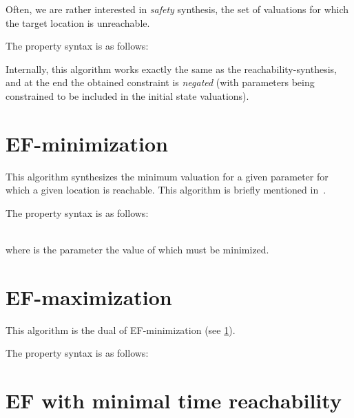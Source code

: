 Often, we are rather interested in \emph{safety} synthesis, \ie{} the set of valuations for which the target location is unreachable.

%

The property syntax is as follows:


Internally, this algorithm works exactly the same as the reachability-synthesis, and at the end the obtained constraint is \emph{negated} (with parameters being constrained to be included in the initial state valuations).


\section{EF-minimization}\label{ss:mode:EFmin}

This algorithm synthesizes the minimum valuation for a given parameter for which a given location is reachable.
This algorithm is briefly mentioned in~\cite{ABPV19}.

The property syntax is as follows:

\\
where  is the parameter the value of which must be minimized.



\section{EF-maximization}\label{ss:mode:EFmax}

This algorithm is the dual of EF-minimization (see \cref{ss:mode:EFmin}).

The property syntax is as follows:



\section{EF with minimal time reachability}\label{ss:mode:EFopt}

